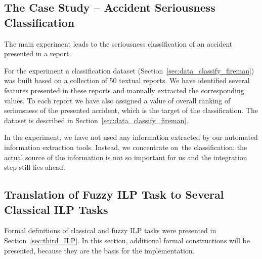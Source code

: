 
\subsection{The Case Study -- Accident Seriousness Classification} \label{sec:fuzzy_case}



The main experiment leads to the seriousness classification of an accident presented in a report. %

For the experiment a classification dataset (Section~\ref{sec:data_classify_fireman}) was built based on a collection of 50 textual reports. We have identified several features presented in these reports and manually extracted the corresponding values. To each report we have also assigned a value of overall ranking of seriousness of the presented accident, which is the target of the classification. The dataset is described in Section~\ref{sec:data_classify_fireman}. 

In the experiment, we have not used any information extracted by our automated information extraction tools. Instead, we concentrate on~the classification; the actual source of the information is not so important for us and the integration step still lies ahead.






\subsection{Translation of Fuzzy ILP Task to Several Classical ILP Tasks} \label{sec:fuzzy_ilp_task_translation}

Formal definitions of classical and fuzzy ILP tasks were presented in Section~\ref{sec:third_ILP}. In this section, additional formal constructions will be presented, because they are the basis for the implementation.


